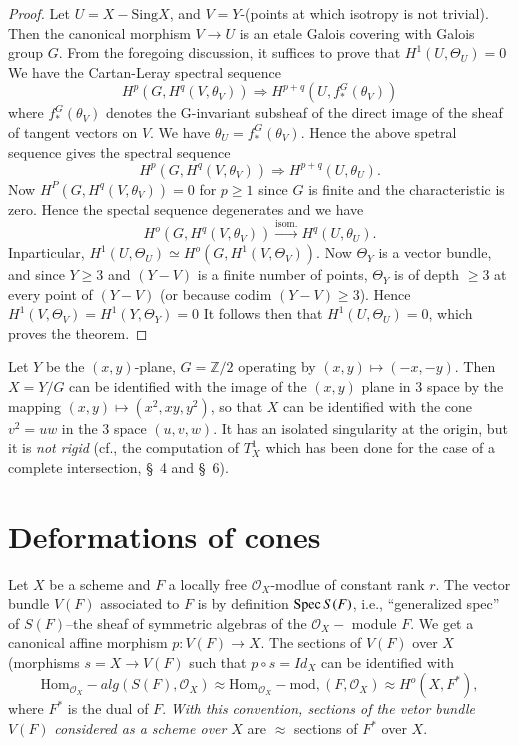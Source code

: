 {\begin{proof}
Let $U=X-\text{Sing} X$, and $V=Y$-(points at which isotropy is not
trivial). Then the canonical morphism $V\to U$ is an etale Galois
covering with Galois group $G$. From the foregoing discussion, it
suffices to prove that $H^1(U, \Theta_U)=0$ We have the Cartan-Leray
spectral sequence  
$$
H^{p}(G, H^{q}(V, \theta_V))\Rightarrow H^{p+q}(U, f^{G}_{\ast}(\theta_V))
$$
where $f^{G}_{\ast}(\theta_V)$ denotes the G-invariant subsheaf of the
direct image of the sheaf of tangent vectors on $V$. We have
$\theta_U = f^{G}_{\ast}(\theta_{V})$. Hence the above spetral sequence
gives the spectral sequence 
$$
H^{p}(G, H^{q}(V, \theta_V))\Rightarrow H^{p+q}(U, \theta_U).
$$
Now $H^{P}(G, H^{q}(V, \theta_V))=0$ for $p\ge 1$ since $G$ is finite
and the characteristic is zero. Hence the spectal sequence degenerates
and we have 
$$
H^{o}(G, H^{q}(V, \theta_V))\xrightarrow{\text{isom}.} H^{q}(U, \theta_U).
$$
In\pageoriginale particular, $H^{1}(U, \Theta_U)\simeq H^{o}(G,
H^{1}(V, \Theta_V))$. Now $\Theta_Y$ is a vector bundle, and
since  $Y\ge 3$ and $(Y-V)$ is a finite number of points,
$\Theta_Y$ is of depth $\ge 3$ at every point of $(Y-V)$ (or because
codim $(Y-V)\ge 3$). Hence $H^{1}(V, \Theta_V)=H^{1}(Y, \Theta_{Y})=0$
It follows then that $H^{1}(U, \Theta_U)=0$, which proves the
theorem. 
\end{proof}

\begin{remark}\label{part1-rem10.1}%
Let $Y$ be the $(x, y)$-plane, $G=\mathbb{Z}/2$ operating by $(x,
y)\mapsto (-x, -y)$. Then $X=Y/G$ can be identified with the image of
the $(x, y)$ plane in $3$ space by the mapping $(x, y)\mapsto(x^{2},
xy, y^{2})$, so that $X$ can be identified with the cone $v^{2}=uw$ in
the $3$ space $(u, v, w)$. It has an isolated singularity at the
origin, but it is {\em not rigid} (cf., the computation of $T_X^{1}$
which has been done for the case of a complete intersection, \S\ 4
and \S\ 6). 
\end{remark}

\section{Deformations of cones}\label{part1-sec11}

Let $X$ be a scheme and $F$ a locally free $\mathscr{O}_X$-modlue of
constant rank $r$. The vector bundle $V(F)$ associated to $F$ is by
definition $\operatorname{Spec} S(F)$, i.e., ``generalized spec'' of $S(F)$--the
sheaf of symmetric algebras of the $\mathscr{O}_X-$ module $F$. We get
a canonical affine morphism $p:V(F)\to X$. The sections of $V(F)$ over
$X$ (morphisms $s=X\to V(F)$ such that $p\circ s= Id_X$ can be
identified with 
$$
\text{Hom}_{\mathscr{O}_X}-alg(S(F), \mathscr{O}_X)\approx \text{Hom}_{\mathscr{O}_X}-\text{mod},
(F, \mathscr{O}_X)\approx  H^{o}(X, F^{\ast}), 
$$
where $F^{\ast}$ is the dual of $F$. {\em With this convention,
sections of the vetor bundle} $V(F)$ {\em considered as a scheme over}
$X$ are $\approx$ sections of $F^{\ast}$ over $X$. 
 
}
